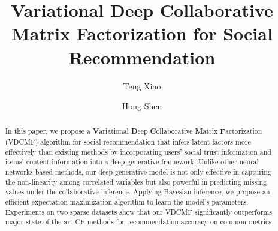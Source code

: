 \documentclass[runningheads]{llncs}
\def \VCMF {VDCMF}
\begin{document}
%
\title{Variational  Deep Collaborative Matrix Factorization for Social Recommendation}
%
%
\author{Teng Xiao\and
Hong Shen
}
%
%
%
\maketitle              %
%
\begin{abstract}
In this paper, we propose a \textbf{V}ariational  \textbf{D}eep  \textbf{C}ollaborative \textbf{M}atrix \textbf{F}actorization  (\VCMF{}) algorithm %
for social recommendation that infers latent factors more effectively than existing methods
by incorporating users' social trust information and items' content information into a deep generative framework.
Unlike other neural networks based methods, our  deep generative model is not only effective in capturing the non-linearity among correlated variables but also powerful in predicting missing values under the collaborative inference. Applying Bayesian inference, we propose an efficient  expectation-maximization algorithm to learn the model's parameters. Experiments  on  two sparse datasets show that our \VCMF {} significantly outperforms major state-of-the-art CF methods for recommendation accuracy on common metrics. %


\end{abstract}
%
%
%






%
%
%


%
\end{document}
